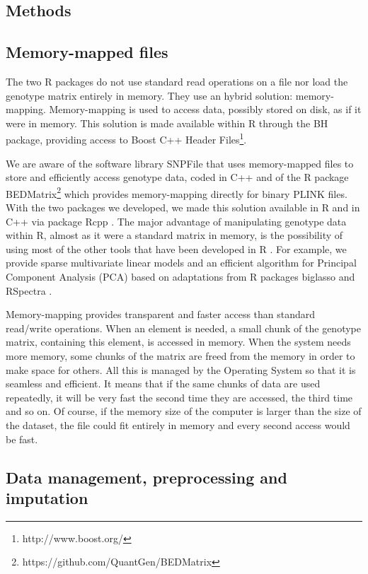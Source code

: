 \documentclass{bioinfo}
\begin{document}
\begin{methods}
\section{Methods}

\subsection{Memory-mapped files}

The two R packages do not use standard read operations on a file nor load the genotype matrix entirely in memory. They use an hybrid solution: memory-mapping. Memory-mapping is used to access data, possibly stored on disk, as if it were in memory. This solution is made available within R through the BH package, providing access to Boost C++ Header Files\footnote{http://www.boost.org/}.

We are aware of the software library SNPFile that uses memory-mapped files to store and efficiently access genotype data, coded in C++ \cite[]{Nielsen2008} and of the R package BEDMatrix\footnote{https://github.com/QuantGen/BEDMatrix} which provides memory-mapping directly for binary PLINK files. With the two packages we developed, we made this solution available in R and in C++ via package Rcpp \cite[]{Eddelbuettel2011}. The major advantage of manipulating genotype data within R, almost as it were a standard matrix in memory, is the possibility of using most of the other tools that have been developed in R \cite[]{R2017}. For example, we provide sparse multivariate linear models and an efficient algorithm for Principal Component Analysis (PCA) based on adaptations from R packages biglasso and RSpectra \cite[]{RSpectra2016,Zeng2017}.

Memory-mapping provides transparent and faster access than standard read/write operations. 
When an element is needed, a small chunk of the genotype matrix, containing this element, is accessed in memory. 
When the system needs more memory, some chunks of the matrix are freed from the memory in order to make space for others. 
All this is managed by the Operating System so that it is seamless and efficient. 
It means that if the same chunks of data are used repeatedly, it will be very fast the second time they are accessed, the third time and so on. 
Of course, if the memory size of the computer is larger than the size of the dataset, the file could fit entirely in memory and every second access would be fast. 


\subsection{Data management, preprocessing and imputation} \label{sec:preprocess}


\end{methods}
\end{document}
